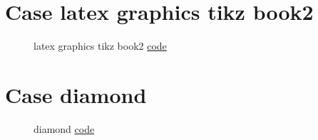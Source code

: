 \documentclass{article}
\begin{document}
\section{Case latex graphics tikz book2}

\begin{figure}[H]
    \centering
    
    \caption{latex graphics tikz book2 \href{https:/github.com/cauliyang/learn_tikz/blob/main/source/source/latex_graphics_tikz_book2.tex}{code} }
    \label{fig:latex graphics tikz book2}
\end{figure}

\section{Case diamond}

\begin{figure}[H]
    \centering
    
    \caption{diamond \href{https:/github.com/cauliyang/learn_tikz/blob/main/source/source/diamond.tex}{code} }
    \label{fig:diamond}
\end{figure}
\end{document}
